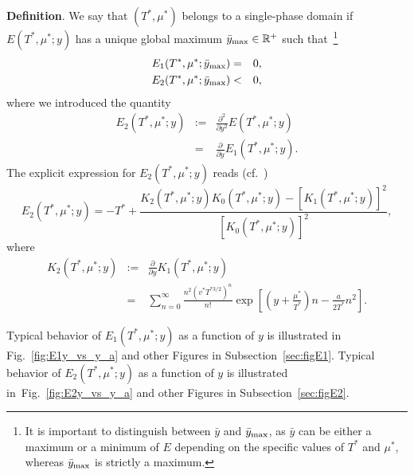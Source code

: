 \documentclass[12pt]{article}
\numberwithin{equation}{section}
\begin{document}
	\textbf{Definition}. We say that $(T^*, \mu^*)$ belongs to a single-phase domain if $E(T^*,\mu^*;y)$ has a unique global maximum $\bar{y}_{\rm max} \in \mathbb{R}^{+}$ such that~\footnote{It is important to distinguish between $\bar{y}$ and $\bar{y}_{\rm max}$, as $\bar{y}$ can be either a maximum or a minimum of $E$ depending on the specific values of $T^*$ and $\mu^*$, whereas $\bar{y}_{\rm max}$ is strictly a maximum.}
	\begin{eqnarray}
		\label{cond:max}
		E_1(T^*, \mu^*; \bar{y}_{\rm max}) & = & 0,
		\nonumber\\
		E_2(T^*, \mu^*;\bar{y}_{\rm max}) & < & 0,
	\end{eqnarray}
	where we introduced the quantity
	\begin{eqnarray}
		\label{def:E2}
		E_2(T^*, \mu^*;y) & := & \frac{\partial^2}{\partial y^2} E(T^*,\mu^*;y)
		\\
		& = & \frac{\partial}{\partial y} E_1(T^*,\mu^*;y).
		\nonumber
	\end{eqnarray}
	The explicit expression for $E_2(T^*,\mu^*;y)$ reads (cf.~\cite[(20)]{KD22})
	\begin{equation}
		\label{def:reducedE2}
		E_2(T^*,\mu^*;y) = -T^* + \frac{K_2(T^*,\mu^*;y) K_0(T^*,\mu^*;y) - [K_1(T^*,\mu^*;y)]^2}{[K_0(T^*,\mu^*;y)]^2},
	\end{equation}
	where
	\begin{eqnarray}
		K_2(T^*,\mu^*;y) & := & \frac{\partial}{\partial y} K_1(T^*,\mu^*;y)
		\nonumber\\
		& = & \sum_{n=0}^{\infty} \frac{n^2 (v^* T^{*3/2})^n}{n!} \exp[\left(y+\frac{\mu^*}{T^*}\right)n - \frac{a}{2T^*}n^2].
	\end{eqnarray}
	
	Typical behavior of $E_1(T^*,\mu^*;y)$ as a function of $y$ is illustrated in Fig.~\ref{fig:E1y_vs_y_a} and other Figures in Subsection~\ref{sec:figE1}.	
	Typical behavior of $E_2(T^*,\mu^*;y)$ as a function of $y$ is illustrated in~Fig.~\ref{fig:E2y_vs_y_a} and other Figures in Subsection~\ref{sec:figE2}.
	
\end{document}
